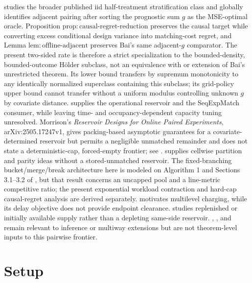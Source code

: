 \documentclass{article}
\begin{document}
\cite{bai2022optimality} studies the broader published iid half-treatment stratification class and globally identifies adjacent pairing after sorting the prognostic sum \(g\) as the MSE-optimal oracle. Proposition \(\mathrm{prop:causal\text{-}regret\text{-}reduction}\) preserves the causal target while converting excess conditional design variance into matching-cost regret, and Lemma \(\mathrm{lem:offline\text{-}adjacent}\) preserves Bai's same adjacent-\(g\) comparator. The present two-sided rate is therefore a strict specialization to the bounded-density, bounded-outcome Hölder subclass, not an equivalence with or extension of Bai's unrestricted theorem. Its lower bound transfers by supremum monotonicity to any identically normalized superclass containing this subclass; its grid-policy upper bound cannot transfer without a uniform modulus controlling unknown \(g\) by covariate distance. \cite{kapelnerkrieger2023learning} supplies the operational reservoir and the SeqExpMatch consumer, while leaving time- and occupancy-dependent capacity tuning unresolved. Morrison's \emph{Reservoir Designs for Online Paired Experiments}, arXiv:2505.17247v1, gives packing-based asymptotic guarantees for a covariate-determined reservoir but permits a negligible unmatched remainder and does not state a deterministic-cap, forced-empty frontier; see \cite{morrison2025reservoir}. \cite{zhaozhou2024pigeonhole} supplies cellwise partition and parity ideas without a stored-unmatched reservoir. The fixed-branching bucket/merge/break architecture here is modeled on Algorithm 1 and Sections 3.1--3.2 of \cite{ascheretal2026generalarrivals}, but that result concerns an uncapped pool and a line-metric competitive ratio; the present exponential workload contraction and hard-cap causal-regret analysis are derived separately. \cite{azarchiplunkarkaplan2017delays} motivates multilevel charging, while its delay objective does not provide endpoint clearance. \cite{kanoria2025dynamicspatial} studies replenished or initially available supply rather than a depleting same-side reservoir. \cite{bairomanoshaikh2022inference}, \cite{bailiutabordmeehan2024tuples}, and \cite{melnykwangwattenhofer2021kway} remain relevant to inference or multiway extensions but are not theorem-level inputs to this pairwise frontier.

\section{Setup}
\end{document}
